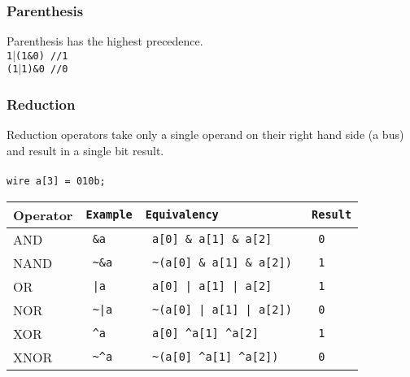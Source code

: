 \documentclass[letterpaper,11pt]{article}
\begin{document}
        \subsubsection{Parenthesis}
        Parenthesis has the highest precedence. \\
        \texttt{1$\mid$(1\&0) \slash\slash1} \\
        \texttt{(1$\mid$1)\&0 \slash\slash 0} \\
        
        \subsubsection{Reduction}
        Reduction operators take only a single operand on their right hand side (a bus) and result in a
        single bit result. \\\\
        \texttt{wire a[3] = 010b;} \\
        
        \begin{center} 
        \begin{tabular}{|l|>{\texttt\bgroup}l<{\egroup}|>{\texttt\bgroup}l<{\egroup}|>{\texttt\bgroup}l<{\egroup}|}
        \hline
        Operator&Example&Equivalency&Result\\ \hline
        AND		&	\&a       	&	a[0] \& a[1] \& a[2]     &	0		\\ \hline
        NAND		&	\textasciitilde \&a      	&	\textasciitilde(a[0] \& a[1] \& a[2])  &	1		\\ \hline
        OR		&	|a       	&	a[0] | a[1] | a[2]       &	1		\\ \hline
        NOR		&	\textasciitilde |a      	&	\textasciitilde (a[0] | a[1] | a[2])    & 	0		\\ \hline
        XOR		&	\textasciicircum a 	&	a[0] \textasciicircum a[1] \textasciicircum a[2]       &	1		\\ \hline
        XNOR		&	\textasciitilde \textasciicircum a	&	\textasciitilde(a[0] \textasciicircum a[1] \textasciicircum a[2])    & 	0		\\ \hline
        \end{tabular}
        \end{center}
        
\end{document}
